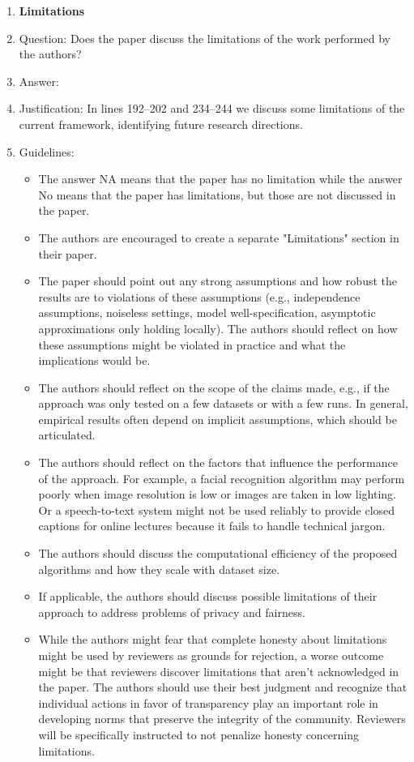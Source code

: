 \documentclass{article}
\theoremstyle{plain}
\theoremstyle{remark}
\begin{document}
\begin{enumerate}
\item {\bf Limitations}
    \item[] Question: Does the paper discuss the limitations of the work performed by the authors?
    \item[] Answer: \answerYes{} %
    \item[] Justification: In lines 192--202 and 234--244 we discuss some limitations of the current framework, identifying future research directions.
    \item[] Guidelines:
    \begin{itemize}
        \item The answer NA means that the paper has no limitation while the answer No means that the paper has limitations, but those are not discussed in the paper. 
        \item The authors are encouraged to create a separate "Limitations" section in their paper.
        \item The paper should point out any strong assumptions and how robust the results are to violations of these assumptions (e.g., independence assumptions, noiseless settings, model well-specification, asymptotic approximations only holding locally). The authors should reflect on how these assumptions might be violated in practice and what the implications would be.
        \item The authors should reflect on the scope of the claims made, e.g., if the approach was only tested on a few datasets or with a few runs. In general, empirical results often depend on implicit assumptions, which should be articulated.
        \item The authors should reflect on the factors that influence the performance of the approach. For example, a facial recognition algorithm may perform poorly when image resolution is low or images are taken in low lighting. Or a speech-to-text system might not be used reliably to provide closed captions for online lectures because it fails to handle technical jargon.
        \item The authors should discuss the computational efficiency of the proposed algorithms and how they scale with dataset size.
        \item If applicable, the authors should discuss possible limitations of their approach to address problems of privacy and fairness.
        \item While the authors might fear that complete honesty about limitations might be used by reviewers as grounds for rejection, a worse outcome might be that reviewers discover limitations that aren't acknowledged in the paper. The authors should use their best judgment and recognize that individual actions in favor of transparency play an important role in developing norms that preserve the integrity of the community. Reviewers will be specifically instructed to not penalize honesty concerning limitations.
    \end{itemize}


\end{enumerate}
\end{document}
